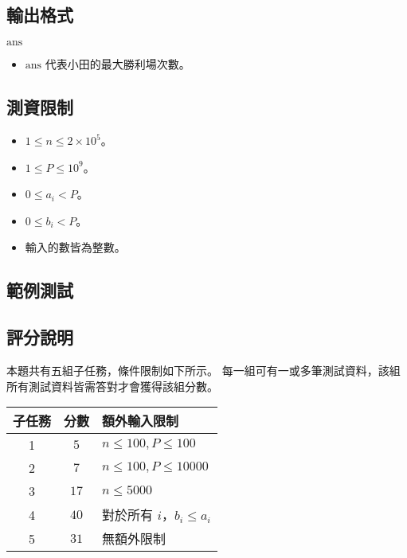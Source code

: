 \subsection{輸出格式}

\begin{format}
\f{
$\textrm{ans}$
}
\end{format}

\begin{itemize}
\tightlist
\item
  \(\textrm{ans}\) 代表小田的最大勝利場次數。
\end{itemize}

\subsection{測資限制}

\begin{itemize}
\tightlist
\item
  \(1 \le n \le 2\times 10^5\)。
\item
  \(1 \le P \le 10^9\)。
\item
  \(0 \le a_i < P\)。
\item
  \(0 \le b_i < P\)。
\item
  輸入的數皆為整數。
\end{itemize}

\subsection{範例測試}

\begin{example}
%
%
\end{example}

\subsection{評分說明}

本題共有五組子任務，條件限制如下所示。
每一組可有一或多筆測試資料，該組所有測試資料皆需答對才會獲得該組分數。

\begin{longtable}[]{@{}ccl@{}}
\toprule
子任務 & 分數 & 額外輸入限制 \\
\midrule
\endhead
1 & \(5\) & \(n \le 100, P \le 100\) \\
2 & \(7\) & \(n \le 100, P \le 10000\) \\
3 & \(17\) & \(n \le 5000\) \\
4 & \(40\) & 對於所有 \(i\)，\(b_i \le a_i\) \\
5 & \(31\) & 無額外限制 \\
\bottomrule
\end{longtable}
